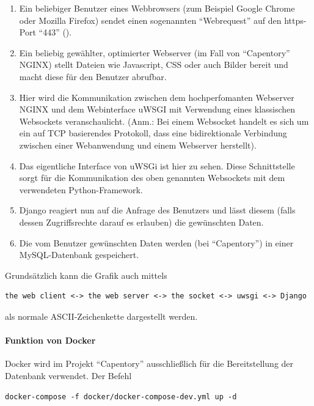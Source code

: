 \begin{enumerate}
\def\labelenumi{\arabic{enumi}.}
\tightlist
\item
  Ein beliebiger Benutzer eines Webbrowsers (zum Beispiel Google Chrome
  oder Mozilla Firefox) sendet einen sogenannten ``Webrequest'' auf den
  https-Port ``443'' ().
\item
  Ein beliebig gewählter, optimierter Webserver (im Fall von
  ``Capentory'' NGINX) stellt Dateien wie Javascript, CSS oder auch
  Bilder bereit und macht diese für den Benutzer abrufbar.
\item
  Hier wird die Kommunikation zwischen dem hochperfomanten Webserver
  NGINX und dem Webinterface uWSGI mit Verwendung eines klassischen
  Websockets veranschaulicht. (Anm.: Bei einem Websocket handelt es sich
  um ein auf TCP basierendes Protokoll, dass eine bidirektionale
  Verbindung zwischen einer Webanwendung und einem Webserver herstellt).
\item
  Das eigentliche Interface von uWSGi ist hier zu sehen. Diese
  Schnittstelle sorgt für die Kommunikation des oben genannten
  Websockets mit dem verwendeten Python-Framework.
\item
  Django reagiert nun auf die Anfrage des Benutzers und lässt diesem
  (falls dessen Zugriffsrechte darauf es erlauben) die gewünschten
  Daten.
\item
  Die vom Benutzer gewünschten Daten werden (bei ``Capentory'') in einer
  MySQL-Datenbank gespeichert.
\end{enumerate}

Grundsätzlich kann die Grafik auch mittels

\begin{verbatim}
the web client <-> the web server <-> the socket <-> uwsgi <-> Django
\end{verbatim}

als normale ASCII-Zeichenkette dargestellt werden.

\hypertarget{funktion-von-docker}{%
\paragraph{Funktion von Docker}\label{funktion-von-docker}}

Docker wird im Projekt ``Capentory'' ausschließlich für die
Bereitstellung der Datenbank verwendet. Der Befehl

\texttt{docker-compose\ -f\ docker/docker-compose-dev.yml\ up\ -d}

